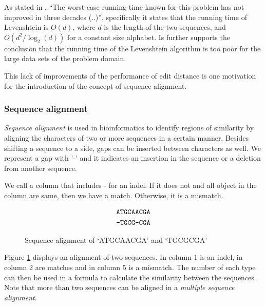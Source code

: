 As stated in \cite[pp.~1-2]{andoni}, ``The worst-case running time known for
this problem has not improved in three decades (..)'', specifically it states
that the running time of Levenshtein is $O(d)$, where $d$ is the length of the
two sequences, and $O(d^2/\log_2(d))$ for a constant size alphabet. Is further
supports the conclusion that the running time of the Levenshtein algorithm is
too poor for the large data sets of the problem domain.

This lack of improvements of the performance of edit distance is one motivation
for the introduction of the concept of sequence alignment.


\subsubsection{Sequence alignment}
\emph{Sequence alignment} is used in bioinformatics to identify regions of
similarity by aligning the characters of two or more sequences in a certain
manner. Besides shifting a sequence to a side, gaps can be inserted between
characters as well.  We represent a gap with '-' and it indicates an insertion
in the sequence or a deletion from another sequence.

We call a column that includes - for an indel. If it does not and all object in
the column are same, then we have a match. Otherwise, it is a mismatch.

\begin{figure}[H]
  \centering
  \begin{align*}
    \mbox{\texttt{ATGCAACGA}} \\
    \mbox{\texttt{-TGCG-CGA}}
  \end{align*}
  \caption{Sequence alignment of `ATGCAACGA' and `TGCGCGA'}
  \label{fig:seqAlignment}
\end{figure}

Figure \ref{fig:seqAlignment} displays an alignment of two sequences. In column
1 is an indel, in column 2 are matches and in column 5 is a mismatch.  The
number of each type can then be used in a formula to calculate the similarity
between the sequences. Note that more than two sequences can be aligned in a
\emph{multiple sequence alignment}.

